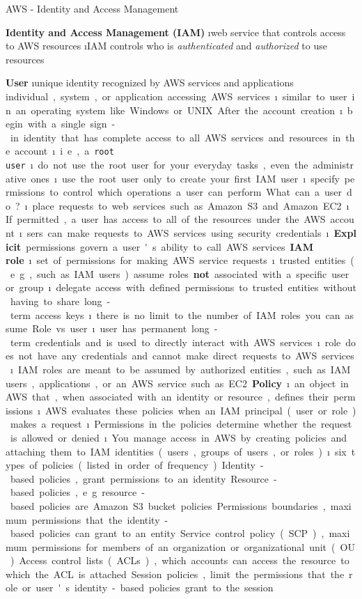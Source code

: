 \begin{frame}{AWS - Identity and Access Management}

\textbf{Identity and Access Management (IAM)}
\i web service that controls access to AWS resources
\i IAM controls who is \textit{authenticated} and \textit{authorized} to use resources

\textbf{User}
\i unique identity recognized by AWS services and applications
\si individual, system, or application accessing AWS services
\i similar to user in an operating system like Windows or UNIX

After the account creation
\i begin with a single sign-in identity that has complete access
to all AWS services and resources in the account
\i i.e., a \lstinline{root user}
\i do not use the root user for your everyday tasks, even the administrative ones
\i use the root user only to create your first IAM user
\i specify permissions to control which operations a user can perform

What can a user do?
\i place requests to web services such as Amazon S3 and Amazon EC2
\i If permitted, a user has access to all of the resources under the AWS account
\i sers can make requests to AWS services using security credentials
\i \textbf{Explicit} permissions govern a user's ability to call AWS services

\textbf{IAM role}
\i set of permissions for making AWS service requests
\i trusted entities (e.g., such as IAM users) assume roles
\si \textbf{not} associated with a specific user or group
\i delegate access with defined permissions to trusted entities without having to share long-term access keys
\i there is no limit to the number of IAM roles you can assume

Role vs user
\i user has permanent long-term credentials and is used to directly interact with AWS services
\i role does not have any credentials and cannot make direct requests to AWS services
\i IAM roles are meant to be assumed by authorized entities, such as IAM users, applications, or an AWS service such as EC2.

\textbf{Policy}
\i an object in AWS that, when associated with an identity or resource, defines their permissions
\i AWS evaluates these policies when an IAM principal (user or role) makes a request
\i Permissions in the policies determine whether the request is allowed or denied
\i You manage access in AWS by creating policies and attaching them to IAM identities (users, groups of users, or roles)
\i six types of policies (listed in order of frequency)
\si Identity-based policies, grant permissions to an identity.
\si Resource-based policies, e.g. resource-based policies are Amazon S3 bucket policies
\si Permissions boundaries, maximum permissions that the identity-based policies can grant to an entity
\si Service control policy (SCP), maximum permissions for members of an organization or organizational unit (OU)
\si Access control lists (ACLs), which accounts can access the resource to which the ACL is attached.
\si Session policies, limit the permissions that the role or user's identity-based policies grant to the session
\end{frame}

